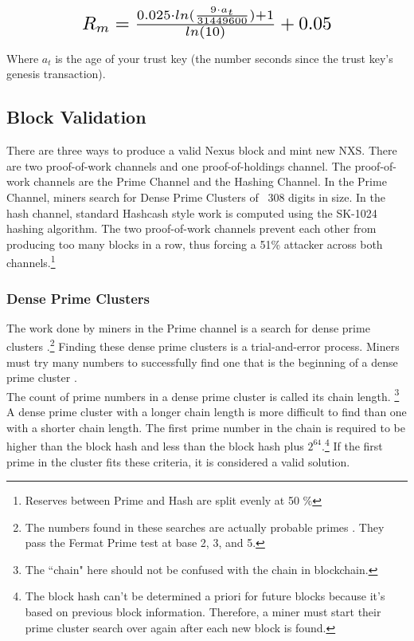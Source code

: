 \documentclass[11pt]{article}
\begin{document}
\paragraph{}
\begin{equation}
\resizebox{.65\hsize}{!}{$R_m = \frac{0.025 \cdot ln(\frac{9 \cdot a_{t}}{31449600}) + 1}{ln(10)} + 0.05$}
\end{equation}

\noindent Where $a_t$ is the age of your trust key (the number seconds since the trust key's genesis transaction).

\subsection{Block Validation}

There are three ways to produce a valid Nexus block and mint new NXS.
There are two proof-of-work channels and one proof-of-holdings channel.
The proof-of-work channels are the Prime Channel and the Hashing Channel.
In the Prime Channel, miners search for Dense Prime Clusters of ~308 digits in size.
In the hash channel, standard Hashcash \cite{hashcash} style work is computed using the SK-1024 hashing algorithm. 
The two proof-of-work channels prevent each other from producing too many blocks in a row, thus forcing a 51\% attacker across both channels.\footnote{Reserves between Prime and Hash are split evenly at 50 \%}

\subsubsection{Dense Prime Clusters}

The work done by miners in the Prime channel is a search for dense prime clusters \cite{wikiprimecluster}.\footnote{The numbers found in these searches are actually probable primes \cite{wikiprobable}. They pass the Fermat Prime test \cite{wikifermat} at base 2, 3, and 5.}
Finding these dense prime clusters is a trial-and-error process.
Miners must try many numbers to successfully find one that is the beginning of a dense prime cluster \cite{wolframprimecluster,primesolominer}.\\ 

\noindent The count of prime numbers in a dense prime cluster is called its chain length.
\footnote{The ``chain" here should not be confused with the chain in blockchain.}
A dense prime cluster with a longer chain length is more difficult to find than one with a shorter chain length.
The first prime number in the chain is required to be higher than the block hash and less than the block hash plus $2^{64}$.\footnote{The block hash can't be determined a priori for future blocks because it's based on previous block information. 
Therefore, a miner must start their prime cluster search over again after each new block is found.}
If the first prime in the cluster fits these criteria, it is considered a valid solution.\\
\end{document}
